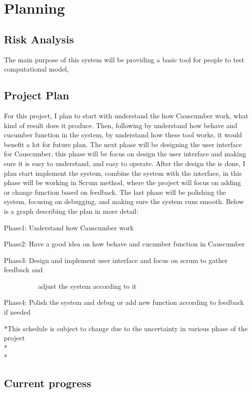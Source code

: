 \chapter{Planning}

\section{Risk Analysis}

The main purpose of this system will be providing a basic tool for people to test computational model, 

\section{Project Plan}

For this project, I plan to start with understand the how Causcumber work, what kind of result does it produce. Then, following by understand how behave and cucumber function in the system, by understand how these tool works, it would benefit a lot for future plan. The next phase will be designing the user interface for Causcumber, this phase will be focus on design the user interface and making sure it is easy to understand, and easy to operate. After the design the is done, I plan start implement the system, combine the system with the interface, in this phase will be working in Scrum method, where the project will focus on adding or change function based on feedback. The last phase will be polishing the system, focusing on debugging, and making sure the system runs smooth. Below is a graph describing the plan in more detail:

Phase1: Understand how Causcumber work

Phase2: Have a good idea on how behave and cucumber function in Causcumber

Phase3: Design and implement user interface and focus on scrum to gather feedback and \space 

~~~~~~ ~ ~ adjust the system according to it

Phase4: Polish the system and debug or add new function according to feedback if needed

*This schedule is subject to change due to the uncertainty in various phase of the project\\*\\*



\section{Current progress}

